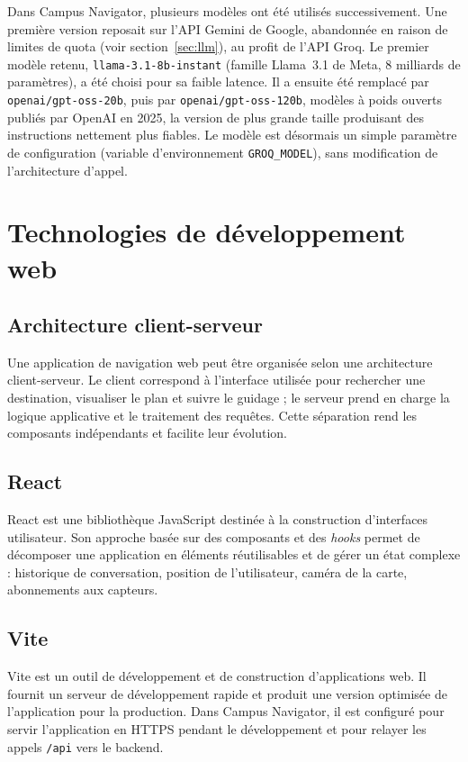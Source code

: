 \documentclass[12pt,a4paper]{report}
\begin{document}
Dans Campus Navigator, plusieurs modèles ont été utilisés successivement. Une première version
reposait sur l'API Gemini de Google, abandonnée en raison de limites de quota (voir
section~\ref{sec:llm}), au profit de l'API Groq. Le premier modèle retenu,
\texttt{llama-3.1-8b-instant} (famille Llama~3.1 de Meta, 8 milliards de paramètres), a été
choisi pour sa faible latence. Il a ensuite été remplacé par \texttt{openai/gpt-oss-20b}, puis par
\texttt{openai/gpt-oss-120b}, modèles à poids ouverts publiés par OpenAI en 2025, la version de
plus grande taille produisant des instructions nettement plus fiables. Le modèle est désormais un
simple paramètre de configuration (variable d'environnement \texttt{GROQ\_MODEL}), sans
modification de l'architecture d'appel.

\section{Technologies de développement web}

\subsection{Architecture client-serveur}

Une application de navigation web peut être organisée selon une architecture client-serveur. Le
client correspond à l'interface utilisée pour rechercher une destination, visualiser le plan et
suivre le guidage ; le serveur prend en charge la logique applicative et le traitement des
requêtes. Cette séparation rend les composants indépendants et facilite leur évolution.

\subsection{React}

React est une bibliothèque JavaScript destinée à la construction d'interfaces utilisateur. Son
approche basée sur des composants et des \emph{hooks} permet de décomposer une application en
éléments réutilisables et de gérer un état complexe : historique de conversation, position de
l'utilisateur, caméra de la carte, abonnements aux capteurs.

\subsection{Vite}

Vite est un outil de développement et de construction d'applications web. Il fournit un serveur de
développement rapide et produit une version optimisée de l'application pour la production. Dans
Campus Navigator, il est configuré pour servir l'application en HTTPS pendant le développement et
pour relayer les appels \texttt{/api} vers le backend.
\end{document}
